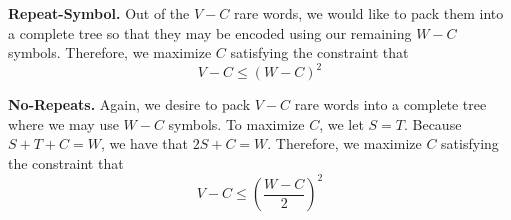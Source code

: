 \noindent\textbf{Repeat-Symbol.}
Out of the $V - C$ rare words, we would like to pack them into a complete tree
so that they may be encoded using our remaining $W - C$ symbols. Therefore, we
maximize $C$ satisfying the constraint that
$$V - C \leq (W - C)^{2}$$

\noindent\textbf{No-Repeats.}
Again, we desire to pack $V - C$ rare words into a complete tree where we may
use $W - C$ symbols. To maximize $C$, we let $S = T$. Because $S + T + C = W$,
we have that $2S + C = W$. Therefore, we maximize $C$ satisfying the constraint
that
$$V - C \leq (\frac{W - C}{2})^{2}$$
